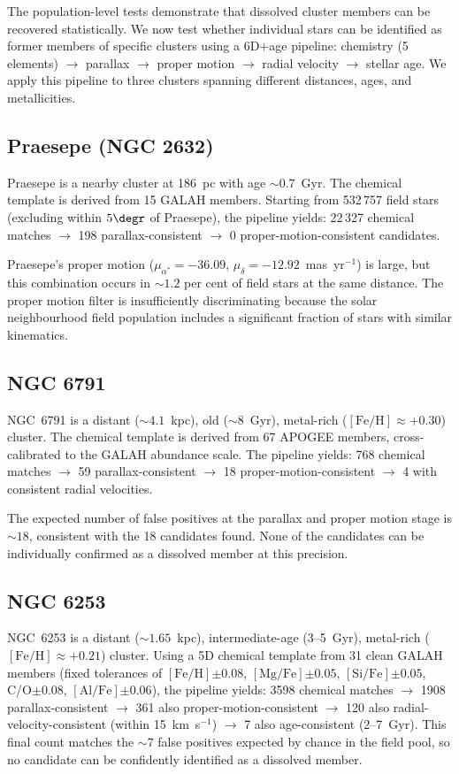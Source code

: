 \documentclass[fleqn,usenatbib]{mnras}
\newcommand{\feh}{$\mathrm{[Fe/H]}$\xspace}
\newcommand{\mgfe}{$\mathrm{[Mg/Fe]}$\xspace}
\newcommand{\sife}{$\mathrm{[Si/Fe]}$\xspace}
\newcommand{\alfe}{$\mathrm{[Al/Fe]}$\xspace}
\newcommand{\co}{C/O\xspace}
\newcommand{\kms}{km~s$^{-1}$\xspace}
\begin{document}
The population-level tests demonstrate that dissolved cluster members can be recovered statistically.
We now test whether individual stars can be identified as former members of specific clusters using a 6D+age pipeline: chemistry (5 elements) $\to$ parallax $\to$ proper motion $\to$ radial velocity $\to$ stellar age.
We apply this pipeline to three clusters spanning different distances, ages, and metallicities.

\subsection{Praesepe (NGC 2632)}

Praesepe is a nearby cluster at 186~pc with age ${\sim}0.7$~Gyr.
The chemical template is derived from 15 GALAH members.
Starting from 532\,757 field stars (excluding within $5\degr$ of Praesepe), the pipeline yields: 22\,327 chemical matches $\to$ 198 parallax-consistent $\to$ 0 proper-motion-consistent candidates.

Praesepe's proper motion ($\mu_{\alpha^*} = -36.09$, $\mu_\delta = -12.92$~mas~yr$^{-1}$) is large, but this combination occurs in ${\sim}1.2$ per cent of field stars at the same distance.
The proper motion filter is insufficiently discriminating because the solar neighbourhood field population includes a significant fraction of stars with similar kinematics.

\subsection{NGC 6791}

NGC~6791 is a distant (${\sim}4.1$~kpc), old (${\sim}8$~Gyr), metal-rich ($\mathrm{[Fe/H]} \approx +0.30$) cluster.
The chemical template is derived from 67 APOGEE members, cross-calibrated to the GALAH abundance scale.
The pipeline yields: 768 chemical matches $\to$ 59 parallax-consistent $\to$ 18 proper-motion-consistent $\to$ 4 with consistent radial velocities.

The expected number of false positives at the parallax and proper motion stage is ${\sim}18$, consistent with the 18 candidates found.
None of the candidates can be individually confirmed as a dissolved member at this precision.

\subsection{NGC 6253}

NGC~6253 is a distant (${\sim}1.65$~kpc), intermediate-age (3--5~Gyr), metal-rich ($\mathrm{[Fe/H]} \approx +0.21$) cluster.
Using a 5D chemical template from 31 clean GALAH members (fixed tolerances of \feh $\pm 0.08$, \mgfe $\pm 0.05$, \sife $\pm 0.05$, \co $\pm 0.08$, \alfe $\pm 0.06$), the pipeline yields: 3598 chemical matches $\to$ 1908 parallax-consistent $\to$ 361 also proper-motion-consistent $\to$ 120 also radial-velocity-consistent (within 15~\kms) $\to$ 7 also age-consistent (2--7~Gyr).
This final count matches the ${\sim}7$ false positives expected by chance in the field pool, so no candidate can be confidently identified as a dissolved member.
\end{document}
